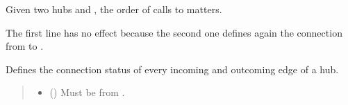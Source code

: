 \documentclass[letterpaper,10pt,english]{sphinxmanual}
\begin{document}
\begin{fulllineitems}
\begin{fulllineitems}
\sphinxAtStartPar
Given two hubs  and , the order of calls to  matters.

\begin{sphinxVerbatim}[commandchars=\\\{\}]
  
  
    
\end{sphinxVerbatim}

\sphinxAtStartPar
The first line has no effect because the second one defines again the connection from  to .

\end{fulllineitems}


\begin{fulllineitems}
\label{\detokenize{generated/tamos.network.HREThermalNetwork:tamos.network.HREThermalNetwork.set_node_status}}
\pysigstartsignatures
{}
\pysigstopsignatures
\sphinxAtStartPar
Defines the connection status of every incoming and outcoming edge of a hub.
\begin{quote}\begin{description}
\begin{itemize}
\item {} 
\sphinxAtStartPar
{} ({\hyperref[\detokenize{generated/tamos.Hub:tamos.Hub}]{}}) \textendash{} Must be from .


\end{itemize}
\end{description}
\end{quote}
\end{fulllineitems}
\end{fulllineitems}
\end{document}
